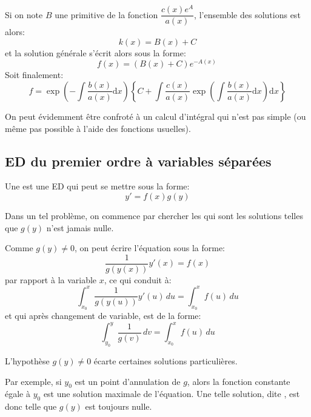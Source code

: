 Si on note $B$ une primitive de la fonction $\dfrac{c(x) e^A}{a(x)}$, l'ensemble des solutions est alors:
\begin{equation}
    k(x) = B(x) + C
\end{equation}
et la solution générale s'écrit alors sous la forme:
\begin{equation}
    f(x) = (B(x) + C) e^{-A(x)}\,
\end{equation}
Soit finalement:
\begin{equation}
    f = \exp\left( -\int\frac{b(x)}{a(x)}\mathrm dx \right) \left\{ C + \int \frac{c(x)}{a(x)} \exp\left(\int \frac{b(x)}{a(x)}\mathrm dx\right)\mathrm dx \right\}
\end{equation}

On peut évidemment être confroté à un calcul d'intégral qui n'est pas simple
(ou même pas possible à l'aide des fonctions usuelles).



\medskip
\subsection{ED du premier ordre à variables séparées}

Une  est une 
ED qui peut se mettre sous la forme:
\begin{equation}
    y' = f(x)g(y)
\end{equation}

\medskip
Dans un tel problème, on commence par chercher les 
qui sont les solutions telles que $g(y)$ n'est jamais nulle. 

Comme $g(y)\ne0$, on peut écrire l'équation sous la forme:
\begin{equation}
    \frac{1}{g(y(x))} y'(x) = f(x)
\end{equation}
par rapport à la variable $x$, ce qui conduit à:
\begin{equation}
    \int_{x_0}^x \frac{1}{g(y(u))}y'(u) \, du = \int_{x_0}^x f(u) \, du 
\end{equation}
et qui après changement de variable, est de la forme:
\begin{equation}
    \int_{y_0}^y \frac{1}{g(v)} \, dv = \int_{x_0}^x f(u) \, du 
\end{equation}

\medskip
L'hypothèse $g(y)\ne0$ écarte certaines solutions particulières.

Par exemple, si $y_0$ est un point d'annulation de $g$, alors la fonction constante 
égale à $y_0$ est une solution maximale de l'équation.
Une telle solution, dite , est donc telle que $g(y)$ est toujours nulle.

